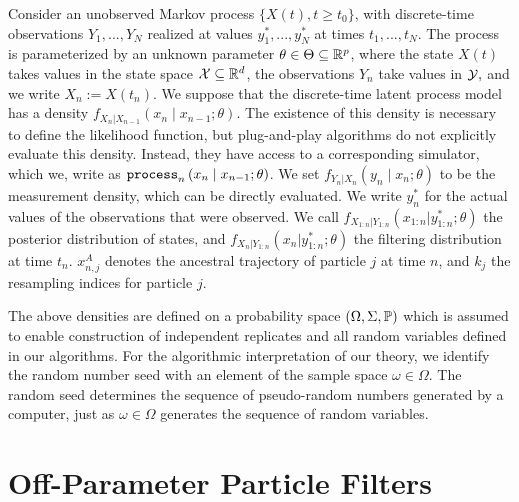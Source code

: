 \documentclass[numsec,webpdf,modern,medium,namedate]{oup-authoring-template}
\newcommand\arxiv[2]{#2} %
\theoremstyle{thmstyleone}%
\theoremstyle{thmstyletwo}%
\theoremstyle{thmstylethree}%
\begin{document}
Consider an unobserved Markov process $\{X(t),t  \geq t_0\}$, with discrete-time observations $Y_1,...,Y_N$ realized at values $y_1^*,...,y_N^*$ at times $t_1,..., t_N$.
The process is parameterized by an unknown parameter $\theta \in \Theta \subseteq \mathbb{R}^p$, where the state $X(t)$ takes values in the state space ${\mathcal{X}} \subseteq \mathbb{R}^d$, the observations $Y_n$ take values in ${\mathcal{Y}},$ and we write $X_n := X(t_n)$. We suppose that the discrete-time latent process model has a density $f_{X_n|X_{n-1}}\left(x_{n} \mid x_{n-1}; \theta\right)$.
The existence of this density is necessary to define the likelihood function, but plug-and-play algorithms do not explicitly evaluate this density.
Instead, they have access to a corresponding simulator, which we, write as $\texttt{process}_n\left(x_n\mid x_{n-1}; \theta\right)$.
We set $f_{Y_n|X_n}\left(y_n \mid x_n; \theta\right)$ to be the measurement density, which  can be directly evaluated. We write $y_n^*$ for the actual values of the observations that were observed.
We call $f_{X_{1:n}|Y_{1:n}}(x_{1:n}|y_{1:n}^*; \theta)$ the posterior distribution of states, and $f_{X_{n}|Y_{1:n}}(x_n|y_{1:n}^*; \theta)$ the filtering distribution at time $t_n$.
$x_{n,j}^A$ denotes the ancestral trajectory of particle $j$ at time $n$,  and $k_j$ the resampling indices for particle $j$. 

The above densities are defined on a probability space $(\Omega, \Sigma, \mathbb{P})$ which is assumed to enable construction of independent replicates and all random variables defined in our algorithms.
For the algorithmic interpretation of our theory, we identify the random number seed with an element of the sample space $\omega \in \Omega$. The random seed determines the sequence of pseudo-random numbers generated by a computer, just as $\omega\in\Omega$ generates the sequence of random variables.


\arxiv{}{\vspace*{-2mm}}
\section{Off-Parameter Particle Filters}
\end{document}
